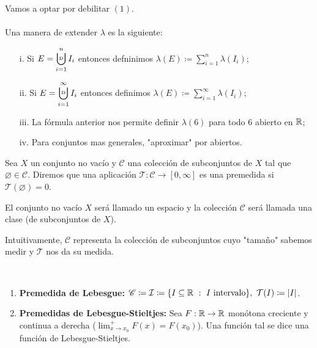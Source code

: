 	\noindent Vamos a optar por debilitar $(1)$. \\\\
	\noindent Una manera de extender $\lambda$ es la siguiente:
	\begin{enumerate}
		\item[i.] Si $E = \displaystyle\bigcupd_{i=1}^{n} I_i$ entonces defninimos $\lambda(E) \coloneq \sum_{i=1}^{n} \lambda (I_i)$;

		\item[ii.] Si $E = \displaystyle\bigcupd_{i=1}^{\infty} I_i$ entonces definimos $\lambda(E) \coloneq \sum_{i=1}^{\infty} \lambda (I_i)$;

		\item[iii.] La fórmula anterior nos permite definir $\lambda (6)$ para todo $6$ abierto en $\mathbb{R}$;

		\item[iv.] Para conjuntos mas generales, "aproximar" por abiertos. 
	\end{enumerate}

	\begin{definition}[premedida]
		Sea $X$ un conjunto no vacío y $\mathscr{C}$ una colección de subconjuntos de $X$ tal que $\varnothing \in \mathscr{C}$. Diremos que una aplicación $\mathcal{T} : \mathscr{C} \to [0,\infty]$ es una premedida si $\mathcal{T} (\varnothing)=0$.
	\end{definition}

	\begin{remark}
		El conjunto no vacío $X$ será llamado un espacio y la colección $\mathscr{C}$ será llamada una clase (de subconjuntos de $X$).
	\end{remark}

	\noindent Intuitivamente, $\mathscr{C}$ representa la colección de subconjuntos cuyo "tamaño" sabemos medir y $\mathcal{T}$ nos da su medida.

	\begin{eg}~
		\begin{enumerate}
			\item \textbf{Premedida de Lebesgue:} $\mathscr{C} \coloneq \mathcal{I} \coloneq \{ I \subseteq \mathbb{R} \ : \ I \text{ intervalo}\}, \ \mathcal{T}(I) \coloneq |I|$.

			\item \textbf{Premedidas de Lebesgue-Stieltjes:} Sea $F:\mathbb{R} \to \mathbb{R}$ monótona creciente y continua a derecha ($\lim_{x \to x_0}^{+} F(x) = F(x_0)$). Una función tal se dice una función de Lebesgue-Stieltjes. 
		\end{enumerate}
	\end{eg}

